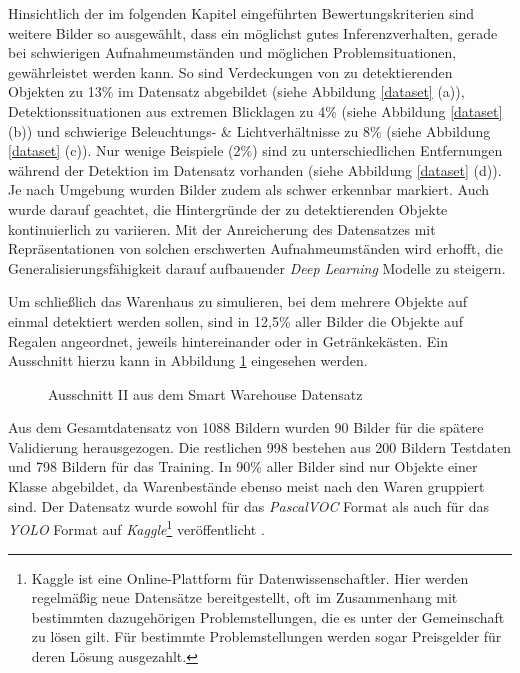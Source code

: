 Hinsichtlich der im folgenden Kapitel eingeführten Bewertungskriterien sind weitere Bilder so ausgewählt, dass ein möglichst gutes Inferenzverhalten, gerade bei schwierigen Aufnahmeumständen und möglichen Problemsituationen, gewährleistet werden kann. So sind Verdeckungen von zu detektierenden Objekten zu 13\% im Datensatz abgebildet (siehe Abbildung \ref{dataset} (a)), Detektionssituationen aus extremen Blicklagen zu 4\% (siehe Abbildung \ref{dataset} (b)) und schwierige Beleuchtungs- \& Lichtverhältnisse zu 8\% (siehe Abbildung \ref{dataset} (c)). Nur wenige Beispiele (2\%) sind zu unterschiedlichen Entfernungen während der Detektion im Datensatz vorhanden (siehe Abbildung \ref{dataset} (d)). Je nach Umgebung wurden Bilder zudem als schwer erkennbar markiert. Auch wurde darauf geachtet, die Hintergründe der zu detektierenden Objekte kontinuierlich zu variieren. Mit der Anreicherung des Datensatzes mit Repräsentationen von solchen erschwerten Aufnahmeumständen wird erhofft, die Generalisierungsfähigkeit darauf aufbauender \textit{Deep Learning} Modelle zu steigern.

Um schließlich das Warenhaus zu simulieren, bei dem mehrere Objekte auf einmal detektiert werden sollen, sind in 12,5\% aller Bilder die Objekte auf Regalen angeordnet, jeweils hintereinander oder in Getränkekästen. Ein Ausschnitt hierzu kann in Abbildung \ref{dataset2} eingesehen werden. 

\begin{figure}[H]
	\hfill
	\hfill
	\caption{Ausschnitt II aus dem Smart Warehouse Datensatz}
	\label{dataset2}
\end{figure}

Aus dem Gesamtdatensatz von 1088 Bildern wurden 90 Bilder für die spätere Validierung herausgezogen. Die restlichen 998 bestehen aus 200 Bildern Testdaten und 798 Bildern für das Training. In 90\% aller Bilder sind nur Objekte einer Klasse abgebildet, da Warenbestände ebenso meist nach den Waren gruppiert sind. Der Datensatz wurde sowohl für das \textit{PascalVOC} Format als auch für das \textit{YOLO} Format auf \textit{Kaggle}\footnote{Kaggle ist eine Online-Plattform für Datenwissenschaftler. Hier werden regelmäßig neue Datensätze bereitgestellt, oft im Zusammenhang mit bestimmten dazugehörigen Problemstellungen, die es unter der Gemeinschaft zu lösen gilt. Für bestimmte Problemstellungen werden sogar Preisgelder für deren Lösung ausgezahlt.} veröffentlicht \cite{FelixHausberger.20200503}.

